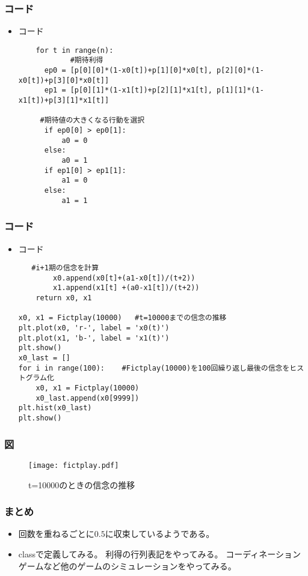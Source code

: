 \documentclass[dvipdfmx,fleqn,handout]{beamer}
\begin{document}
\begin{frame}[fragile]%
\frametitle{コード}
\begin{itemize}\setlength{\parskip}{0.5em}
\item
コード
\begin{verbatim}
    for t in range(n):
            #期待利得 
      ep0 = [p[0][0]*(1-x0[t])+p[1][0]*x0[t], p[2][0]*(1-x0[t])+p[3][0]*x0[t]]
      ep1 = [p[0][1]*(1-x1[t])+p[2][1]*x1[t], p[1][1]*(1-x1[t])+p[3][1]*x1[t]]
            
     #期待値の大きくなる行動を選択
      if ep0[0] > ep0[1]:
          a0 = 0
      else:
          a0 = 1
      if ep1[0] > ep1[1]:
          a1 = 0
      else:
          a1 = 1
\end{verbatim}
\end{itemize}
\end{frame}


\begin{frame}[fragile]%
\frametitle{コード}
\begin{itemize}\setlength{\parskip}{0.5em}
\item
コード
\begin{verbatim}
   #i+1期の信念を計算
        x0.append(x0[t]+(a1-x0[t])/(t+2))   
        x1.append(x1[t] +(a0-x1[t])/(t+2))
    return x0, x1

x0, x1 = Fictplay(10000)   #t=10000までの信念の推移
plt.plot(x0, 'r-', label = 'x0(t)')
plt.plot(x1, 'b-', label = 'x1(t)')
plt.show()
x0_last = []
for i in range(100):    #Fictplay(10000)を100回繰り返し最後の信念をヒストグラム化
    x0, x1 = Fictplay(10000)
    x0_last.append(x0[9999])
plt.hist(x0_last)
plt.show()
\end{verbatim}
\end{itemize}
\end{frame}


\begin{frame}
\frametitle{図}
\begin{figure}
 \centering
 \texttt{[image: fictplay.pdf]}
 \caption{t=10000のときの信念の推移}
 \label{fig:matchingpennies_plot}
\end{figure}
\end{frame}



\begin{frame}
\frametitle{まとめ}
\begin{itemize}\setlength{\parskip}{0.5em}
\item
回数を重ねるごとに$0.5$に収束しているようである。



\item
classで定義してみる。
利得の行列表記をやってみる。
コーディネーションゲームなど他のゲームのシミュレーションをやってみる。
\end{itemize}
\end{frame}
\end{document}
